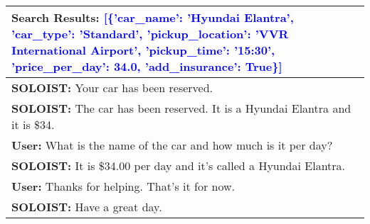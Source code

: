 \begin{table*}[ht]
\begin{tabular}{p{15cm}}
\midrule
\textbf{Search Results:} \textcolor{blue}{[\{'car\_name': 'Hyundai Elantra', 'car\_type': 'Standard', 'pickup\_location': 'VVR International Airport', 'pickup\_time': '15:30', 'price\_per\_day': 34.0, 'add\_insurance': True\}]}  \\
\midrule
\textbf{SOLOIST:} Your car has been reserved. \\
\textbf{SOLOIST:} The car has been reserved. It is a Hyundai Elantra and it is \$34. \\
\textbf{User:} What is the name of the car and how much is it per day? \\
\textbf{SOLOIST:} It is \$34.00 per day and it's called a Hyundai Elantra. \\
\textbf{User:} Thanks for helping. That's it for now. \\
\textbf{SOLOIST:} Have a great day. \\
\bottomrule
\end{tabular}
\label{conv_soloist}
\end{table*}

